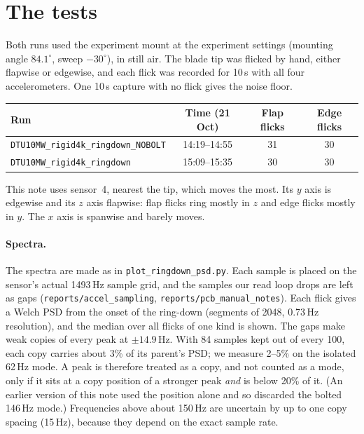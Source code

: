 \documentclass[11pt]{article}
\newcommand{\code}[1]{\texttt{#1}}
\begin{document}
\section{The tests}

Both runs used the experiment mount at the experiment settings (mounting
angle $84.1^\circ$, sweep $-30^\circ$), in still air. The blade tip was
flicked by hand, either flapwise or edgewise, and each flick was recorded for
10\,s with all four accelerometers. One 10\,s capture with no flick gives the
noise floor.

\begin{center}
\begin{tabular}{lccc}
  \toprule
  Run & Time (21 Oct) & Flap flicks & Edge flicks \\
  \midrule
  \code{DTU10MW\_rigid4k\_ringdown\_NOBOLT} & 14:19--14:55 & 31 & 30 \\
  \code{DTU10MW\_rigid4k\_ringdown}         & 15:09--15:35 & 30 & 30 \\
  \bottomrule
\end{tabular}
\end{center}

This note uses sensor~4, nearest the tip, which moves the most. Its $y$ axis
is edgewise and its $z$ axis flapwise: flap flicks ring mostly in $z$ and
edge flicks mostly in $y$. The $x$ axis is spanwise and barely moves.

\paragraph{Spectra.} The spectra are made as in
\code{plot\_ringdown\_psd.py}. Each sample is placed on the sensor's actual
1493\,Hz sample grid, and the samples our read loop drops are left as gaps
(\code{reports/accel\_sampling}, \code{reports/pcb\_manual\_notes}). Each
flick gives a Welch PSD from the onset of the ring-down (segments of 2048,
0.73\,Hz resolution), and the median over all flicks of one kind is shown.
The gaps make weak copies of every peak at $\pm14.9$\,Hz. With 84 samples
kept out of every 100, each copy carries about 3\% of its parent's PSD; we
measure 2--5\% on the isolated 62\,Hz mode. A peak is therefore treated as a
copy, and not counted as a mode, only if it sits at a copy position of a
stronger peak \emph{and} is below 20\% of it. (An earlier version of this
note used the position alone and so discarded the bolted 146\,Hz mode.)
Frequencies above
about 150\,Hz are uncertain by up to one copy spacing (15\,Hz), because they
depend on the exact sample rate.
\end{document}
